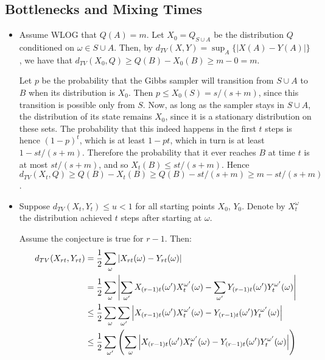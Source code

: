 \documentclass[11pt]{article} \usepackage{amssymb}
\begin{document}
\subsection{Bottlenecks and Mixing Times}
\begin{itemize}
\item 
  Assume WLOG that $Q(A)=m$. 
  Let $X_0=Q_{S\cup A}$ be the distribution $Q$ conditioned on $\omega\in S\cup A$. Then, by 
  $d_{TV}(X,Y)=\sup_A\{|X(A)-Y(A)|\}$, we have that 
  $d_{TV}(X_0,Q)\geq Q(B)-X_0(B)\geq m-0=m$. 
  
  Let $p$ be the probability that
  the Gibbs sampler will transition from $S\cup A$ to $B$ when its distribution
  is $X_0$. Then $p\leq X_0(S) = s/(s+m)$, since this transition is 
  possible only from $S$. Now, as long as the sampler stays in $S\cup A$,
  the distribution of its state remains $X_0$, since it is a stationary
  distribution on these sets. The probability that this indeed happens in the
  first $t$ steps is hence $(1-p)^t$, which is at least $1-pt$, which in turn
  is at least $1-st/(s+m)$.
  Therefore the probability that it ever reaches $B$ at time $t$ is at most
  $st/(s+m)$, and so $X_t(B)\leq st/(s+m)$. 
  Hence $d_{TV}(X_t,Q)\geq Q(B)-X_t(B)\geq Q(B)-st/(s+m) \geq m-st/(s+m)$.

\item
  Suppose $d_{TV}(X_t,Y_t)\leq u < 1$ for all starting points $X_0$, $Y_0$. Denote
  by $X_t^\omega$ the distribution achieved $t$ steps after starting at 
  $\omega$.

  Assume the conjecture is true for $r-1$. Then:
  \begin{align*}
    d_{TV}(X_{rt},Y_{rt}) &= {1\over 2}\sum_\omega |X_{rt}(\omega)-Y_{rt}(\omega)|
    \\ &= {1\over 2}\sum_\omega \left|\sum_{\omega'}X_{(r-1)t}(\omega')X_t^{\omega'}(\omega)-\sum_{\omega'}Y_{(r-1)t}(\omega')Y_t^{\omega'}(\omega)\right|
    \\ &\leq {1\over 2}\sum_\omega \sum_{\omega'}\left|X_{(r-1)t}(\omega')X_t^{\omega'}(\omega)-Y_{(r-1)t}(\omega')Y_t^{\omega'}(\omega)\right|
    \\ &\leq {1\over 2}\sum_{\omega'} \left(\sum_\omega\left|X_{(r-1)t}(\omega')X_t^{\omega'}(\omega)-Y_{(r-1)t}(\omega')Y_t^{\omega'}(\omega)\right|\right)
  \end{align*}
\end{itemize}
\end{document}
